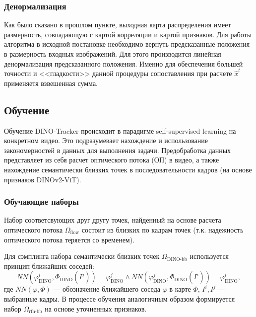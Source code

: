\documentclass[a4paper, 14pt]{extarticle}
\theoremstyle{definition}
\theoremstyle{plain}
\theoremstyle{remark}
\begin{document}
\subsubsection{Денормализация}
Как было сказано в прошлом пункте, выходная карта распределения имеет размерность, совпадающую с картой корреляции и картой признаков.
Для работы алгоритма в исходной постановке необходимо вернуть предсказанные положения в размерность входных изображений. Для этого производится линейная денормализация предсказанного положения. Именно для обеспечения большей точности и <<гладкости>> данной процедуры сопоставления при расчете $\hat{x}^t$ применяетя взвешенная сумма.

\subsection{Обучение}
Обучение DINO-Tracker происходит в парадигме self-supervised learning на конкретном видео. 
Это подразумевает нахождение и использование закономерностей в данных для выполнения задачи. 
Предобработка данных представляет из себя расчет оптического потока (ОП) в видео, а также нахождение семантически близких точек в последовательности кадров (на основе признаков DINOv2-ViT).

\subsubsection{Обучающие наборы}
Набор соответсвующих друг другу точек, найденный на основе расчета оптического потока $\Omega_{\text{flow}}$ состоит из близких по кадрам точек (т.к. надежность оптического потока теряется со временем).

Для сэмплинга набора семантически близких точек $\Omega_{\text{DINO-bb}}$ используется принцип ближайших соседей:
\begin{equation}
	NN(\varphi_{\text{DINO}}^i, \Phi_{\text{DINO}}({I}^j)) = \varphi_{\text{DINO}}^j \land NN(\varphi_{\text{DINO}}^j, \Phi_{\text{DINO}}({I}^i)) = \varphi_{\text{DINO}}^i,
\end{equation}
где $NN(\varphi, \Phi)$ --- обозначение ближайшего соседа $\varphi$ в карте $\Phi$, $I^i, I^j$ --- выбранные кадры.
В процессе обучения аналогичным образом формируется набор $\Omega_{\text{rfn-bb}}$ на основе уточненных признаков.
\end{document}
